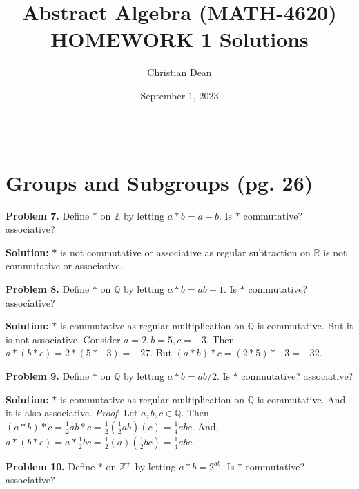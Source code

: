 \documentclass[12pt, letterpaper]{article}
\title{Abstract Algebra (MATH-4620) HOMEWORK 1 Solutions}
\author{Christian Dean}
\date{September 1, 2023}
\newenvironment{problem}
    [1]
    {\noindent \textbf{Problem #1.}}
    {\vspace{3mm}}
\newenvironment{solution}
    [0]
    {\noindent \textbf{Solution:}} 
    {\vspace{3mm}}
\begin{document}
\maketitle

\noindent\hfil\rule{16cm}{0.4pt}\hfil

\section{Groups and Subgroups (pg. 26)}
    \begin{problem}{7}
        Define $*$ on $\mathbb{Z}$ by letting $a*b=a-b$. Is $*$ commutative? 
        associative?
    \end{problem}

    \begin{solution}
        $*$ is not commutative or associative as regular subtraction on
        $\mathbb{R}$ is not commutative or associative.
    \end{solution}

    \begin{problem}{8}
        Define $*$ on $\mathbb{Q}$ by letting $a*b=ab+1$. Is $*$ commutative?
        associative?
    \end{problem}

    \begin{solution}
        $*$ is commutative as regular multiplication on $\mathbb{Q}$ is commutative.
        But it is not associative. Consider $a=2, b=5, c=-3$. Then $a * (b * c) = 
        2 * (5 * -3) = -27$. But $(a * b) * c = (2 * 5) * -3 = -32$.
    \end{solution}

    \begin{problem}{9}
        Define $*$ on $\mathbb{Q}$ by letting $a*b=ab/2$. Is $*$ commutative?
        associative?
    \end{problem}

    \begin{solution}
        $*$ is commutative as regular multiplication on $\mathbb{Q}$ is commutative.
        And it is also associative. \emph{Proof}: Let $a,b,c \in \mathbb{Q}$. Then
        $(a * b) * c = \frac{1}{2}ab * c = \frac{1}{2}(\frac{1}{2}ab)(c) = \frac{1}{4}abc$. 
        And, $a * (b * c) = a * \frac{1}{2}bc = \frac{1}{2}(a)(\frac{1}{2}bc) = \frac{1}{4}abc$.
    \end{solution}

    \begin{problem}{10}
        Define $*$ on $\mathbb{Z}^+$ by letting $a*b=2^{ab}$. Is $*$ commutative?
        associative?
    \end{problem}
\end{document}
